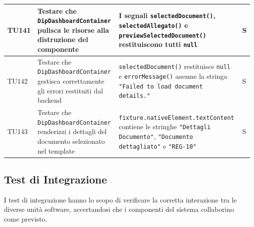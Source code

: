 \documentclass[a4paper,12pt]{article}
\begin{document}
\begin{longtable}{|M{1.2cm}|M{5cm}|M{7cm}|M{1.5cm}|}
            TU141 & Testare che \texttt{DipDashboardContainer} pulisca le risorse alla distruzione del componente & I segnali \texttt{selectedDocument()}, \texttt{selectedAllegato()} e \texttt{previewSelectedDocument()} restituiscono tutti \texttt{null} & S \\ 
            \hline
            
            TU142 & Testare che \texttt{DipDashboardContainer} gestisca correttamente gli errori restituiti dal backend & \texttt{selectedDocument()} restituisce \texttt{null} e \texttt{errorMessage()} assume la stringa \texttt{"Failed to load document details."} & S \\ 
            \hline
            
            TU143 & Testare che \texttt{DipDashboardContainer} renderizzi i dettagli del documento selezionato nel template & \texttt{fixture.nativeElement.textContent} contiene le stringhe \texttt{"Dettagli Documento"}, \texttt{"Documento dettagliato"} e \texttt{"REG-10"} & S \\ 
            \hline

        \end{longtable}


        \subsection{Test di Integrazione}

        I test di integrazione hanno lo scopo di verificare la corretta interazione tra le diverse unità software, accertandosi che i componenti del sistema collaborino come previsto.
\end{document}
